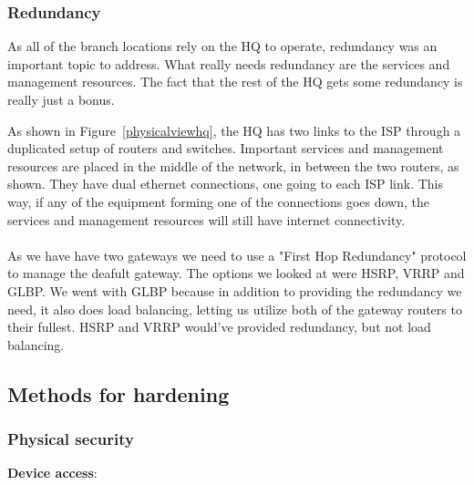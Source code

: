 
\subsubsection{Redundancy}

As all of the branch locations rely on the HQ to operate, redundancy was an important topic to address. What really needs redundancy are the services and management resources. The fact that the rest of the HQ gets some redundancy is really just a bonus.

As shown in Figure~\ref{physicalviewhq}, the HQ has two links to the ISP through a duplicated setup of routers and switches. Important services and management resources are placed in the middle of the network, in between the two routers, as shown. They have dual ethernet connections, one going to each ISP link. This way, if any of the equipment forming one of the connections goes down, the services and management resources will still have internet connectivity.
\\
\\
As we have have two gateways we need to use a "First Hop Redundancy" protocol to manage the deafult gateway. The options we looked at were HSRP, VRRP and GLBP. We went with GLBP because in addition to providing the redundancy we need, it also does load balancing, letting us utilize both of the gateway routers to their fullest. HSRP and VRRP would've provided redundancy, but not load balancing.




\subsection{Methods for hardening}

\subsubsection{Physical security}

\textbf{Device access}:

